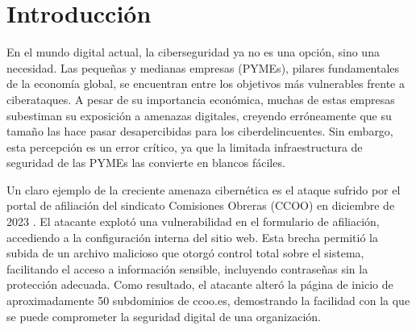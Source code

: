 \documentclass[a4paper, 11pt]{article}
\begin{document}
\thispagestyle{nohead}
\renewcommand{\contentsname}{Índice General}
\tableofcontents
\clearpage

\listoffigures
\thispagestyle{nohead}
\clearpage

\listoftables
{}
\thispagestyle{nohead}
\clearpage

\renewcommand{\lstlistlistingname}{Índice de Códigos}
\thispagestyle{nohead}
\lstlistoflistings
{}

\clearpage









\section{Introducción}
\thispagestyle{nohead}
\par\vspace{0.5cm}

En el mundo digital actual, la ciberseguridad ya no es una opción, sino una necesidad. Las pequeñas y medianas empresas (PYMEs), pilares fundamentales de la economía global, se encuentran entre los objetivos más vulnerables frente a ciberataques. A pesar de su importancia económica, 
muchas de estas empresas subestiman su exposición a amenazas digitales, creyendo erróneamente que su tamaño las hace pasar desapercibidas para los ciberdelincuentes. Sin embargo, esta percepción es un error crítico, ya que la limitada infraestructura de seguridad de las 
PYMEs las convierte en blancos fáciles. 
\par\vspace{0.5cm}

Un claro ejemplo de la creciente amenaza cibernética es el ataque sufrido por el portal de afiliación del sindicato Comisiones Obreras (CCOO) en diciembre de 2023 \cite{napalm-ccoo}. El atacante explotó una vulnerabilidad en el formulario de afiliación, accediendo a la configuración interna del sitio web. Esta brecha permitió la subida de un archivo malicioso que otorgó control total sobre el sistema, facilitando el acceso a información sensible, incluyendo contraseñas sin la protección adecuada. Como resultado, el atacante alteró la página de inicio de aproximadamente 50 subdominios de ccoo.es, demostrando la facilidad con la que se puede comprometer la seguridad digital de una organización.
\par\vspace{0.5cm}
\end{document}
